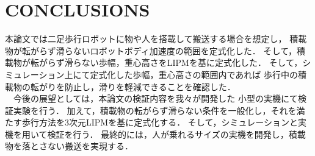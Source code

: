 \documentclass[letterpaper, 10 pt, conference,dvipdfmx]{ieeeconf}  %
\begin{document}




\section{CONCLUSIONS}
本論文では二足歩行ロボットに物や人を搭載して搬送する場合を想定し，
積載物が転がらず滑らないロボットボディ加速度の範囲を定式化した．
そして，積載物が転がらず滑らない歩幅，重心高さをLIPMを基に定式化した．
そして，シミュレーション上にて定式化した歩幅，重心高さの範囲内であれば
歩行中の積載物の転がりを防止し，滑りを軽減できることを確認した．\\
　今後の展望としては，本論文の検証内容を我々が開発した
小型の実機にて検証実験を行う．
加えて，積載物の転がらず滑らない条件を一般化し，それを満たす歩行方法を3次元LIPMを基に定式化する．
そして，シミュレーションと実機を用いて検証を行う．
最終的には，人が乗れるサイズの実機を開発し，積載物を落とさない搬送を実現する．




\nocite{*}


\end{document}
